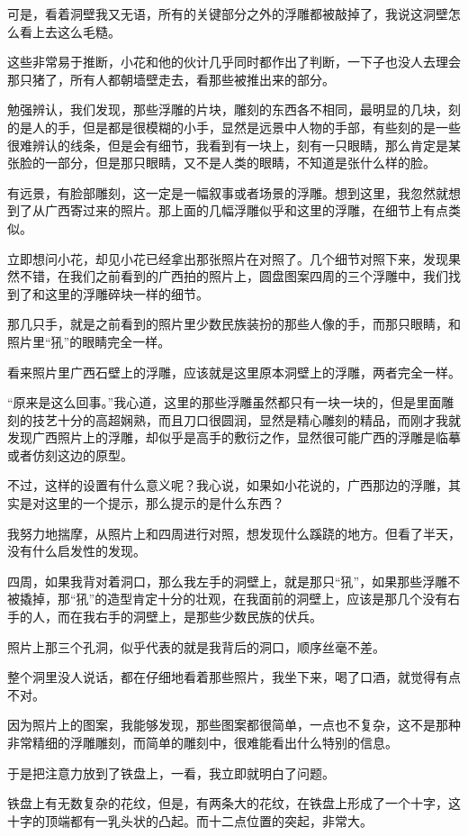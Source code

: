 可是，看着洞壁我又无语，所有的关键部分之外的浮雕都被敲掉了，我说这洞壁怎么看上去这么毛糙。

这些非常易于推断，小花和他的伙计几乎同时都作出了判断，一下子也没人去理会那只猪了，所有人都朝墙壁走去，看那些被推出来的部分。

勉强辨认，我们发现，那些浮雕的片块，雕刻的东西各不相同，最明显的几块，刻的是人的手，但是都是很模糊的小手，显然是远景中人物的手部，有些刻的是一些很难辨认的线条，但是会有细节，我看到有一块上，刻有一只眼睛，那么肯定是某张脸的一部分，但是那只眼睛，又不是人类的眼睛，不知道是张什么样的脸。

有远景，有脸部雕刻，这一定是一幅叙事或者场景的浮雕。想到这里，我忽然就想到了从广西寄过来的照片。那上面的几幅浮雕似乎和这里的浮雕，在细节上有点类似。

立即想问小花，却见小花已经拿出那张照片在对照了。几个细节对照下来，发现果然不错，在我们之前看到的广西拍的照片上，圆盘图案四周的三个浮雕中，我们找到了和这里的浮雕碎块一样的细节。

那几只手，就是之前看到的照片里少数民族装扮的那些人像的手，而那只眼睛，和照片里“犼”的眼睛完全一样。

看来照片里广西石壁上的浮雕，应该就是这里原本洞壁上的浮雕，两者完全一样。

“原来是这么回事。”我心道，这里的那些浮雕虽然都只有一块一块的，但是里面雕刻的技艺十分的高超娴熟，而且刀口很圆润，显然是精心雕刻的精品，而刚才我就发现广西照片上的浮雕，却似乎是高手的敷衍之作，显然很可能广西的浮雕是临摹或者仿刻这边的原型。

不过，这样的设置有什么意义呢？我心说，如果如小花说的，广西那边的浮雕，其实是对这里的一个提示，那么提示的是什么东西？

我努力地揣摩，从照片上和四周进行对照，想发现什么蹊跷的地方。但看了半天，没有什么启发性的发现。

四周，如果我背对着洞口，那么我左手的洞壁上，就是那只“犼”，如果那些浮雕不被撬掉，那“犼”的造型肯定十分的壮观，在我面前的洞壁上，应该是那几个没有右手的人，而在我右手的洞壁上，是那些少数民族的伏兵。

照片上那三个孔洞，似乎代表的就是我背后的洞口，顺序丝毫不差。

整个洞里没人说话，都在仔细地看着那些照片，我坐下来，喝了口酒，就觉得有点不对。

因为照片上的图案，我能够发现，那些图案都很简单，一点也不复杂，这不是那种非常精细的浮雕雕刻，而简单的雕刻中，很难能看出什么特别的信息。

于是把注意力放到了铁盘上，一看，我立即就明白了问题。

铁盘上有无数复杂的花纹，但是，有两条大的花纹，在铁盘上形成了一个十字，这十字的顶端都有一乳头状的凸起。而十二点位置的突起，非常大。

